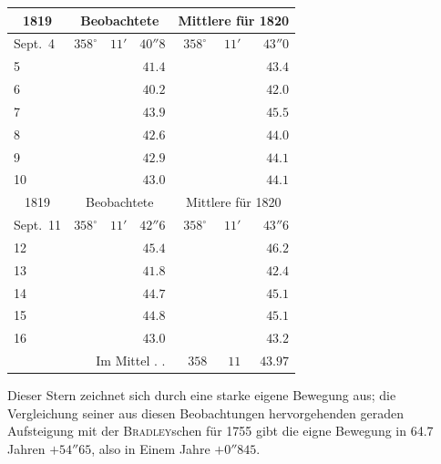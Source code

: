 \begin{center}
\begin{tabular}{l|rrr|rrr}
\multicolumn{1}{c|}{1819}  &  \multicolumn{3}{c|}{Beobachtete}  &  \multicolumn{3}{c}{Mittlere für 1820}  \\
\hline
Sept.\ 4  &  $358^\circ$  &  $11'$  &  $40''8$  &  $358^\circ$  &  $11'$  &  $43''0$  \\
5  &   &   &  $41.4$  &   &   &  $43.4$  \\
6  &   &   &  $40.2$  &   &   &  $42.0$  \\
7  &   &   &  $43.9$  &   &   &  $45.5$  \\
8  &   &   &  $42.6$  &   &   &  $44.0$  \\
9  &   &   &  $42.9$  &   &   &  $44.1$  \\
10  &   &   &  $43.0$  &   &   &  $44.1$  \\
\hline
 \multicolumn{1}{c|}{1819}  &  \multicolumn{3}{c|}{Beobachtete}  &  \multicolumn{3}{c}{Mittlere für 1820}  \\
\hline
 Sept.\ 11  &  $358^\circ$  &  $11'$  &  $42''6$  &  $358^\circ$  &  $11'$  &  $43''6$  \\
 12  &   &   &  $45.4$  &   &   &  $46.2$  \\
 13  &   &   &  $41.8$  &   &   &  $42.4$  \\
 14  &   &   &  $44.7$  &   &   &  $45.1$  \\
 15  &   &   &  $44.8$  &   &   &  $45.1$  \\
 16  &   &   &  $43.0$  &   &   &  $43.2$  \\
\multicolumn{4}{r|}{Im Mittel . .} &  $358$  &  $11$  &  $43.97$  \\
\end{tabular}
\end{center}

\par\indent Dieser Stern zeichnet sich durch eine starke eigene Bewegung aus; die Vergleichung seiner aus diesen Beobachtungen hervorgehenden geraden Aufsteigung mit der \textsc{Bradley}schen für 1755 gibt die eigne Bewegung in 64.7 Jahren $+54''65$, also in Einem Jahre $+0''845$.
